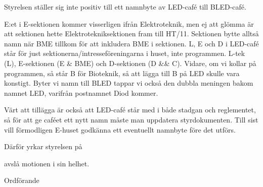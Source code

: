 \documentclass[../_main/handlingar.tex]{subfiles}
\begin{document}
\motionssvar

Styrelsen ställer sig inte positiv till ett namnbyte av LED-café till BLED-café.

E:et i E-sektionen kommer visserligen ifrån Elektroteknik, men ej att glömma är att sektionen hette Elektrotekniksektionen fram till HT/11. Sektionen bytte alltså namn när BME tillkom för att inkludera BME i sektionen. L, E och D i LED-café står för just sektionerna/intresseföreningarna i huset, inte programmen. L-tek (L), E-sektionen (E \& BME) och D-sektionen (D \&\& C). Vidare, om vi kollar på programmen, så står B för Bioteknik, så att lägga till B på LED skulle vara konstigt. Byter vi namn till BLED tappar vi också den dubbla meningen bakom namnet LED, varifrån postnamnet Diod kommer.

Värt att tillägga är också att LED-café står med i både stadgan och reglementet, så för att ge caféet ett nytt namn måste man uppdatera styrdokumenten. Till sist vill förmodligen E-huset godkänna ett eventuellt namnbyte före det utförs.

Därför yrkar styrelsen på
\begin{attsatser}
    \att avslå motionen i sin helhet.
\end{attsatser}

\begin{signatures}{1}
    \ist
    \signature{Erik Månsson}{Ordförande}
\end{signatures}
\end{document}
